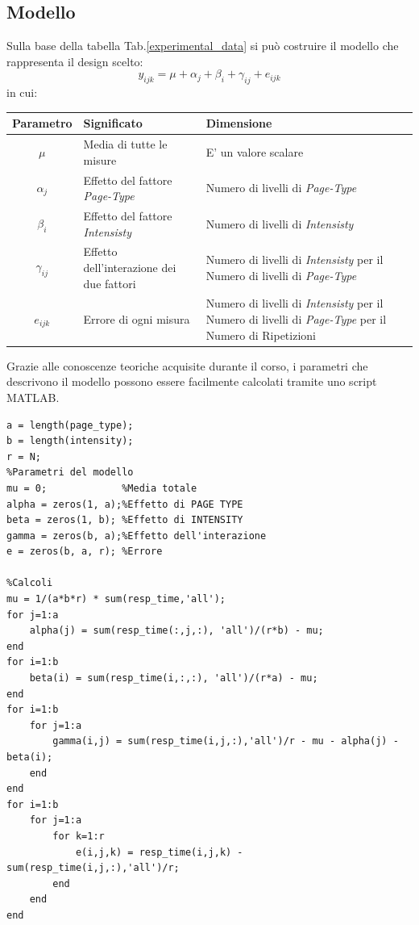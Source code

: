 \subsection{Modello}
Sulla base della tabella Tab.\ref{experimental_data} si può costruire il modello che rappresenta il design scelto:
\begin{equation}
	y_{ijk} = \mu + \alpha_j + \beta_i + \gamma_{ij} + e_{ijk}
\end{equation}
in cui:
\begin{table}[H]
	\begin{center}
		\begin{tabularx}{\textwidth}{c|X|X}
			\textbf{Parametro} & \textbf{Significato} & \textbf{Dimensione}\\
			\hline
			$\mu$ & Media di tutte le misure & E' un valore scalare \\
			\hline
			$ \alpha_j $ & Effetto del fattore \textit{Page-Type} & Numero di livelli di \textit{Page-Type} \\
			\hline
			$ \beta_i $ & Effetto del fattore \textit{Intensisty} & Numero di livelli di \textit{Intensisty} \\
			\hline
			$ \gamma_{ij} $ & Effetto dell'interazione dei due fattori & Numero di livelli di \textit{Intensisty} per il Numero di livelli di \textit{Page-Type}  \\
			\hline
			$ e_{ijk} $ & Errore di ogni misura & Numero di livelli di \textit{Intensisty} per il Numero di livelli di \textit{Page-Type} per il Numero di Ripetizioni  \\
			
		\end{tabularx}
	\end{center}
\end{table}
Grazie alle conoscenze teoriche acquisite durante il corso, i parametri che descrivono il modello possono essere facilmente calcolati tramite uno script MATLAB.
\begin{verbatim}
a = length(page_type);
b = length(intensity);
r = N;
%Parametri del modello
mu = 0;             %Media totale
alpha = zeros(1, a);%Effetto di PAGE TYPE
beta = zeros(1, b); %Effetto di INTENSITY
gamma = zeros(b, a);%Effetto dell'interazione
e = zeros(b, a, r); %Errore

%Calcoli
mu = 1/(a*b*r) * sum(resp_time,'all');
for j=1:a
	alpha(j) = sum(resp_time(:,j,:), 'all')/(r*b) - mu;
end
for i=1:b
	beta(i) = sum(resp_time(i,:,:), 'all')/(r*a) - mu;
end
for i=1:b
	for j=1:a
		gamma(i,j) = sum(resp_time(i,j,:),'all')/r - mu - alpha(j) - beta(i);
	end
end
for i=1:b
	for j=1:a
		for k=1:r
			e(i,j,k) = resp_time(i,j,k) - sum(resp_time(i,j,:),'all')/r;
		end
	end
end
\end{verbatim}
